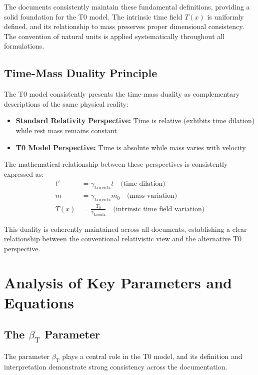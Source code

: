 \documentclass[a4paper,11pt]{article}
\newcommand{\Tfield}{T(x)}
\newcommand{\betaT}{\beta_{\text{T}}}
\newcommand{\Tzero}{T_0}
\newcommand{\gammaf}{\gamma_{\text{Lorentz}}}
\begin{document}
	The documents consistently maintain these fundamental definitions, providing a solid foundation for the T0 model. The intrinsic time field $\Tfield$ is uniformly defined, and its relationship to mass preserves proper dimensional consistency. The convention of natural units is applied systematically throughout all formulations.
	
	\subsection{Time-Mass Duality Principle}
	
	The T0 model consistently presents the time-mass duality as complementary descriptions of the same physical reality:
	
	\begin{itemize}
		\item \textbf{Standard Relativity Perspective:} Time is relative (exhibits time dilation) while rest mass remains constant
		\item \textbf{T0 Model Perspective:} Time is absolute while mass varies with velocity
	\end{itemize}
	
	The mathematical relationship between these perspectives is consistently expressed as:
	\begin{align}
		t' &= \gammaf t \quad \text{(time dilation)} \\
		m &= \gammaf m_0 \quad \text{(mass variation)} \\
		\Tfield &= \frac{\Tzero}{\gammaf} \quad \text{(intrinsic time field variation)}
	\end{align}
	
	This duality is coherently maintained across all documents, establishing a clear relationship between the conventional relativistic view and the alternative T0 perspective.
	
	\section{Analysis of Key Parameters and Equations}
	
	\subsection{The $\betaT$ Parameter}
	
	The parameter $\betaT$ plays a central role in the T0 model, and its definition and interpretation demonstrate strong consistency across the documentation.
	
\end{document}
